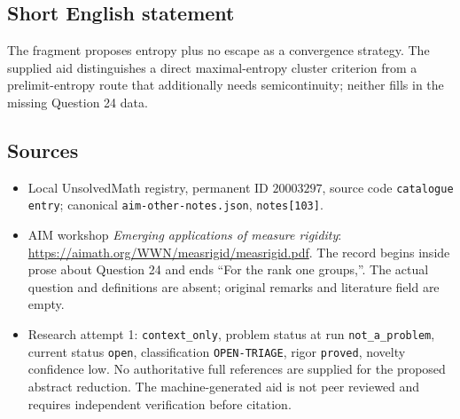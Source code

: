 \documentclass[11pt]{article}
\begin{document}
\subsection{Short English statement}
The fragment proposes entropy plus no escape as a convergence strategy. The supplied aid distinguishes a direct maximal-entropy cluster criterion from a prelimit-entropy route that additionally needs semicontinuity; neither fills in the missing Question 24 data.
\subsection{Sources}
\begin{itemize}
\item Local UnsolvedMath registry, permanent ID $20003297$, source code \texttt{catalogue entry}; canonical \texttt{aim-other-notes.json}, \texttt{notes[103]}.
\item AIM workshop \emph{Emerging applications of measure rigidity}: \url{https://aimath.org/WWN/measrigid/measrigid.pdf}. The record begins inside prose about Question 24 and ends ``For the rank one groups,''. The actual question and definitions are absent; original remarks and literature field are empty.
\item Research attempt 1: \texttt{context\_only}, problem status at run \texttt{not\_a\_problem}, current status \texttt{open}, classification \texttt{OPEN-TRIAGE}, rigor \texttt{proved}, novelty confidence low. No authoritative full references are supplied for the proposed abstract reduction. The machine-generated aid is not peer reviewed and requires independent verification before citation.
\end{itemize}
\end{document}
